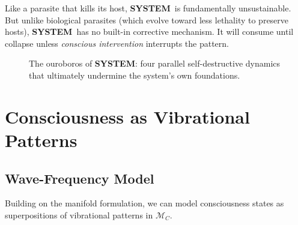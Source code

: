 \documentclass[11pt,a4paper]{article}
\newcommand{\SYSTEM}{\textbf{SYSTEM}}
\theoremstyle{definition}
\theoremstyle{remark}
\begin{document}
\begin{insight}
Like a parasite that kills its host, \SYSTEM\ is fundamentally unsustainable. But unlike biological parasites (which evolve toward less lethality to preserve hosts), \SYSTEM\ has no built-in corrective mechanism. It will consume until collapse unless \textit{conscious intervention} interrupts the pattern.
\end{insight}

\begin{figure}[H]
\centering
{}
\caption{The ouroboros of \SYSTEM: four parallel self-destructive dynamics that ultimately undermine the system's own foundations.}
\label{fig:ouroboros_expanded}
\end{figure}

\section{Consciousness as Vibrational Patterns}
\label{app:consciousness_waves}

\subsection{Wave-Frequency Model}

Building on the manifold formulation, we can model consciousness states as superpositions of vibrational patterns in $\mathcal{M}_C$.
\end{document}

